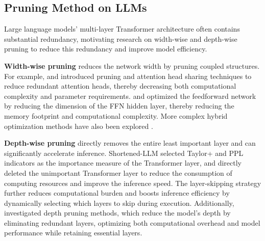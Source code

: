 \subsection{Pruning Method on LLMs}

Large language models' multi-layer Transformer architecture often contains substantial redundancy, motivating research on width-wise and depth-wise pruning to reduce this redundancy and improve model efficiency.

\textbf{Width-wise pruning} reduces the network width by pruning coupled structures. For example, \cite{voita2019analyzing} and \cite{michel2019sixteen} introduced pruning and attention head sharing techniques to reduce redundant attention heads, thereby decreasing both computational complexity and parameter requirements. \cite{nova2023gradient} and \cite{santacroce2023matters} optimized the feedforward network by reducing the dimension of the FFN hidden layer, thereby reducing the memory footprint and computational complexity. More complex hybrid optimization methods have also been explored \cite{lagunas2021block,kwon2022fast,kurtic2024ziplm}.

\textbf{Depth-wise pruning} directly removes the entire least important layer and can significantly accelerate inference. Shortened-LLM \cite{kim2024shortened} selected Taylor+ and PPL indicators as the importance measure of the Transformer layer, and directly deleted the unimportant Transformer layer to reduce the consumption of computing resources and improve the inference speed. The layer-skipping strategy \cite{schuster2022confident,del2023skipdecode,raposo2024mixture} further reduces computational burden and boosts inference efficiency by dynamically selecting which layers to skip during execution. Additionally, \cite{song2024sleb,tang2024rethinking} investigated depth pruning methods, which reduce the model's depth by eliminating redundant layers, optimizing both computational overhead and model performance while retaining essential layers.
